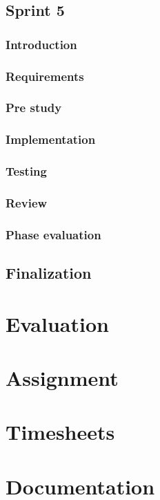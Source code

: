 \documentclass[11pt]{book}
\begin{document}
\section{Sprint 5}
\subsection{Introduction}
\subsection{Requirements}
\subsection{Pre study}
\subsection{Implementation}
\subsection{Testing}
\subsection{Review}
\subsection{Phase evaluation}

\section{Finalization}

\chapter{Evaluation}

\appendix
\chapter{Assignment}

\chapter{Timesheets}

\chapter{Documentation}
\end{document}

